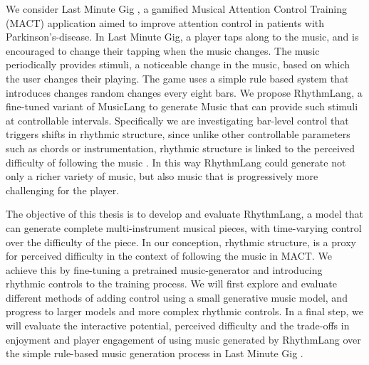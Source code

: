 We consider Last Minute Gig \cite{Chalkiadakis_2022}, a gamified Musical Attention Control Training (MACT) application aimed to improve attention control in patients with Parkinson's-disease. In Last Minute Gig, a player taps along to the music, and is encouraged to change their tapping when the music changes. The music periodically provides stimuli, a noticeable change in the music, based on which the user changes their playing. The game uses a simple rule based system that introduces changes random changes every eight bars. We propose RhythmLang, a fine-tuned variant of MusicLang to generate Music that can provide such stimuli at controllable intervals. Specifically we are investigating bar-level control that triggers shifts in rhythmic structure, since unlike other controllable parameters such as chords or instrumentation, rhythmic structure is linked to the perceived difficulty of following the music \cite{Volk2008Syncopation}. In this way RhythmLang could generate not only a richer variety of music, but also music that is progressively more challenging for the player.   

The objective of this thesis is to develop and evaluate RhythmLang, a model that can generate complete multi-instrument musical pieces, with time-varying control over the difficulty of the piece. In our conception, rhythmic structure, is a proxy for perceived difficulty in the context of following the music in MACT. We achieve this by fine-tuning a pretrained music-generator and  introducing rhythmic controls to the training process. We will first explore and evaluate different methods of adding control using a small generative music model, and progress to larger models and more complex rhythmic controls. In a final step, we will evaluate the interactive potential, perceived difficulty and the trade-offs in enjoyment and player engagement of using music generated by RhythmLang over the simple rule-based music generation process in Last Minute Gig \cite{Chalkiadakis_2022}.

